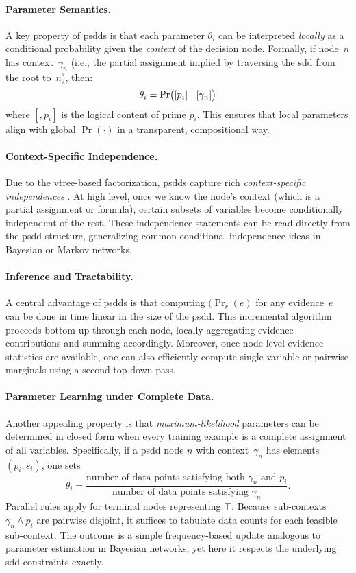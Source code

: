 \paragraph{Parameter Semantics.} A key property of \acrshort{psdd}s is that each parameter $\theta_i$ can be interpreted \emph{locally} as a conditional probability given the \emph{context} of the decision node.  Formally, if node~$n$ has context~$\gamma_n$ (i.e., the partial assignment implied by traversing the \acrshort{sdd} from the root to~$n$), then:
\[
\theta_i =\Pr\bigl([p_i] \bigm|[\gamma_n]\bigr)
\]
where $[,p_i]$ is the logical content of prime $p_i$.  This ensures that local parameters align with global $\Pr(\cdot)$ in a transparent, compositional way.

\paragraph{Context-Specific Independence.} Due to the vtree-based factorization, \acrshort{psdd}s capture rich \emph{context-specific independences} \cite{boutilier_context-specific_2013}.  At high level, once we know the node's context (which is a partial assignment or formula), certain subsets of variables become conditionally independent of the rest.  These independence statements can be read directly from the \acrshort{psdd} structure, generalizing common conditional-independence ideas in Bayesian or Markov networks.

\paragraph{Inference and Tractability.} A central advantage of \acrshort{psdd}s is that computing $(\Pr_r(e)$ for any evidence~$e$ can be done in time linear in the size of the \acrshort{psdd}.  This incremental algorithm proceeds bottom-up through each node, locally aggregating evidence contributions and summing accordingly.  Moreover, once node-level evidence statistics are available, one can also efficiently compute single-variable or pairwise marginals using a second top-down pass.

\paragraph{Parameter Learning under Complete Data.} Another appealing property is that \emph{maximum-likelihood} parameters can be determined in closed form when every training example is a complete assignment of all variables.  Specifically, if a \acrshort{psdd} node $n$ with context~$\gamma_n$ has elements $(p_i, s_i)$, one sets
\[
\theta_i = \frac{\text{number of data points satisfying both } \gamma_n \text{ and } p_i}
{\text{number of data points satisfying } \gamma_n}.
\]
Parallel rules apply for terminal nodes representing $\top$.  Because sub-contexts $\gamma_n \wedge p_i$ are pairwise disjoint, it suffices to tabulate data counts for each feasible sub-context.  The outcome is a simple frequency-based update analogous to parameter estimation in Bayesian networks, yet here it respects the underlying \acrshort{sdd} constraints exactly.


